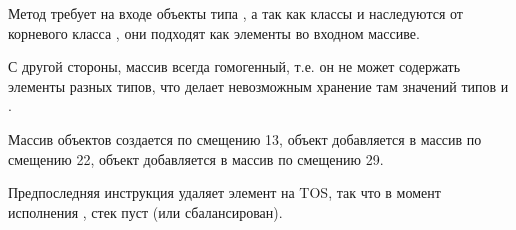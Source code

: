 Метод  требует на входе объекты типа , а так как классы  и
 наследуются от корневого класса , они подходят как элементы
во входном массиве.

С другой стороны, массив всегда гомогенный, т.е. он не может содержать элементы разных типов,
что делает невозможным хранение там значений типов  и .


Массив объектов  создается по смещению 13, 
объект  добавляется в массив по смещению 22, 
объект  добавляется в массив по смещению 29.


Предпоследняя инструкция  удаляет элемент на \ac{TOS}, 
так что в момент исполнения , стек пуст (или сбалансирован).
